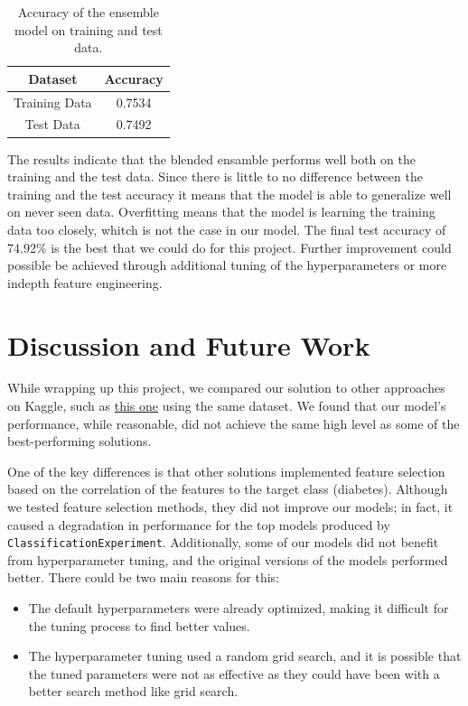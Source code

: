 \documentclass[a4paper,12pt]{article}
\begin{document}
\begin{table}[h]
    \centering
    \begin{tabular}{|c|c|}
        \hline
        \textbf{Dataset} & \textbf{Accuracy} \\
        \hline
        Training Data & 0.7534 \\
        Test Data & 0.7492 \\
        \hline
    \end{tabular}
    \caption{Accuracy of the ensemble model on training and test data.}
    \label{tab:accuracy_results}
\end{table}

The results indicate that the blended ensamble performs well both on the training and the test data. Since there is little to no difference between the training and the test accuracy it means that the model is able to generalize well on never seen data. 
Overfitting means that the model is learning the training data too closely, whitch is not the case in our model.
The final test accuracy of 74.92\% is the best that we could do for this project. 
Further improvement could possible be achieved through additional tuning of the hyperparameters or more indepth feature engineering.




\section{Discussion and Future Work}

While wrapping up this project, we compared our solution to other approaches on Kaggle, such as \href{https://www.kaggle.com/code/solafajobi/diabetes-perfect-prediction}{this one} using the same dataset. 
We found that our model's performance, while reasonable, did not achieve the same high level as some of the best-performing solutions.

One of the key differences is that other solutions implemented feature selection based on the correlation of the features to the target class (diabetes). 
Although we tested feature selection methods, they did not improve our models; in fact, it caused a degradation in performance for the top models produced by \texttt{ClassificationExperiment}. 
Additionally, some of our models did not benefit from hyperparameter tuning, and the original versions of the models performed better. 
There could be two main reasons for this:
\begin{itemize}
    \item The default hyperparameters were already optimized, making it difficult for the tuning process to find better values.
    \item The hyperparameter tuning used a random grid search, and it is possible that the tuned parameters were not as effective as they could have been with a better search method like grid search.
\end{itemize}
\end{document}
